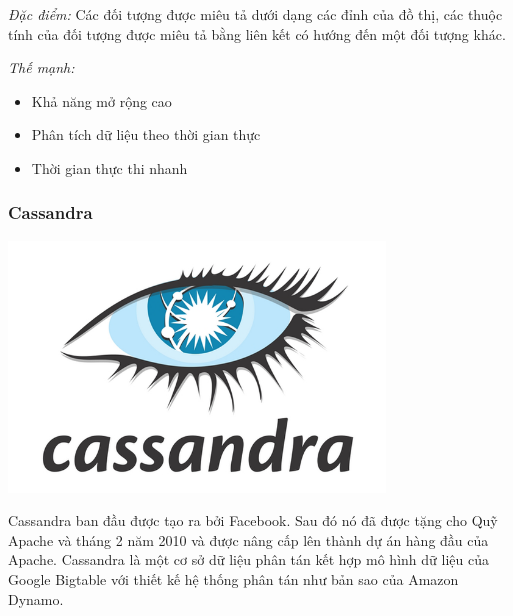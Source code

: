 \textit{Đặc điểm:} Các đối tượng được miêu tả dưới dạng các đỉnh của đồ thị, các thuộc tính của đối tượng được miêu tả bằng liên kết có hướng đến một đối tượng khác.

\textit{Thế mạnh:}
\begin{itemize}
    \item Khả năng mở rộng cao
    \item Phân tích dữ liệu theo thời gian thực
    \item Thời gian thực thi nhanh
\end{itemize}
\subsubsection{Cassandra}
\begin{center}
  \captionsetup{type=figure}
  \includegraphics[width=10cm]{img/cassandra.png}
\end{center}

Cassandra ban đầu được tạo ra bởi Facebook. Sau đó nó đã được tặng cho Quỹ Apache và tháng 2 năm 2010 và được nâng cấp lên thành dự án hàng đầu của Apache. Cassandra là một cơ sở dữ liệu phân tán kết hợp mô hình dữ liệu của Google Bigtable với thiết kế hệ thống phân tán như bản sao của Amazon Dynamo.\\

